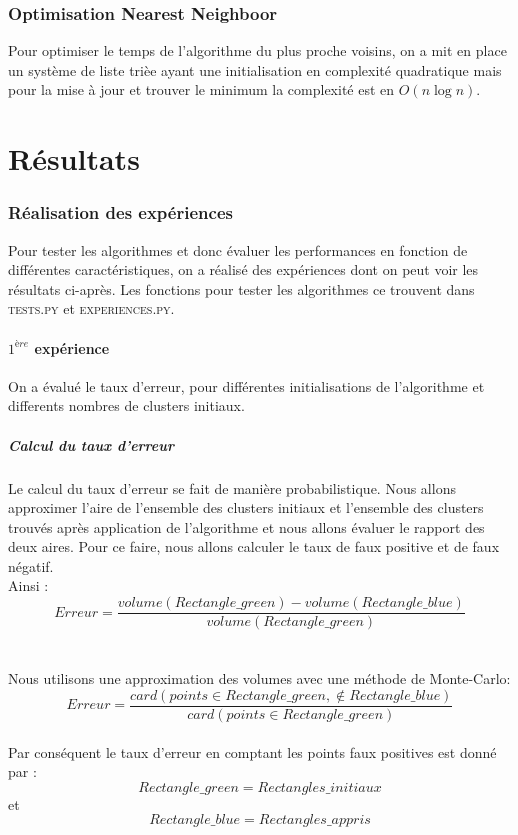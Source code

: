 \documentclass[a4paper,english,titlepage]{article}
\begin{document}
 
	\section{Optimisation Nearest Neighboor}
Pour optimiser le temps de l'algorithme du plus proche voisins, on a mit en place un système de liste trièe 
ayant une initialisation en complexité quadratique mais pour 
la mise à jour et trouver le minimum la complexité est en $O(n\log{n}) $.
	\clearpage
 	\newpage

\part{Résultats}

\section{Réalisation des expériences}
Pour tester les algorithmes et donc évaluer les performances en fonction de différentes caractéristiques, on a réalisé des expériences dont on peut voir les résultats ci-après.
Les fonctions pour tester les algorithmes ce trouvent dans \textsc{tests.py} et \textsc{experiences.py}.

\subsection{$1^{ère}$ expérience}
On a évalué le taux d'erreur, pour différentes initialisations de l'algorithme et differents nombres de clusters initiaux.\\
\subsubsection{Calcul du taux d'erreur}
Le calcul du taux d'erreur se fait de manière probabilistique. Nous allons approximer l'aire de l'ensemble des clusters initiaux et l'ensemble des clusters
trouvés après application de l'algorithme et nous allons évaluer le rapport des deux aires. Pour ce faire, nous allons calculer le taux de faux positive et 
de faux négatif.\\
Ainsi :\\ $$Erreur = \frac{volume(Rectangle\_green) - volume(Rectangle\_blue)}{volume(Rectangle\_green)}$$\\
\\
Nous utilisons une approximation des volumes avec une méthode de Monte-Carlo:\\
$$Erreur = \frac{card({points \in Rectangle\_green, \notin Rectangle\_blue})}{card(points \in Rectangle\_green)}$$
\\Par conséquent le taux d'erreur en comptant les points faux positives est donné par : \\ $$Rectangle\_green = Rectangles\_initiaux$$ et  $$Rectangle\_blue = Rectangles\_appris$$ \\
\end{document}
